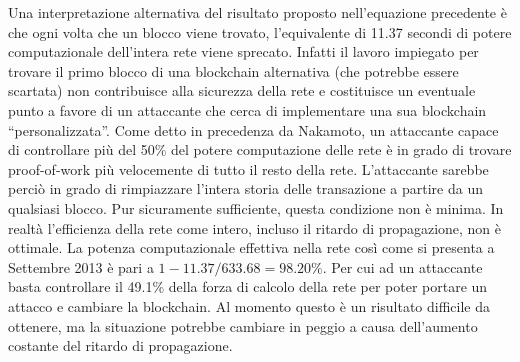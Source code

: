 Una interpretazione alternativa del risultato proposto nell'equazione precedente è che ogni volta che un blocco viene trovato, l'equivalente di 11.37 secondi di potere computazionale dell'intera rete viene sprecato. Infatti il lavoro impiegato per trovare il primo blocco di una blockchain alternativa (che potrebbe essere scartata) non contribuisce alla sicurezza della rete e costituisce un eventuale punto a favore di un attaccante che cerca di implementare una sua blockchain ``personalizzata''. Come detto in precedenza da Nakamoto, un attaccante capace di controllare più del 50\% del potere computazione delle rete è in grado di trovare proof-of-work più velocemente di tutto il resto della rete. L'attaccante sarebbe perciò in grado di rimpiazzare l'intera storia delle transazione a partire da un qualsiasi blocco. Pur sicuramente sufficiente, questa condizione non è minima. In realtà l'efficienza della rete come intero, incluso il ritardo di propagazione, non è ottimale. La potenza computazionale effettiva nella rete così come si presenta a Settembre 2013 è pari a $1 - 11.37 / 633.68 = 98.20\%$. Per cui ad un attaccante basta controllare il 49.1\% della forza di calcolo della rete per poter portare un attacco e cambiare la blockchain. Al momento questo è un risultato difficile da ottenere, ma la situazione potrebbe cambiare in peggio a causa dell'aumento costante del ritardo di propagazione.
